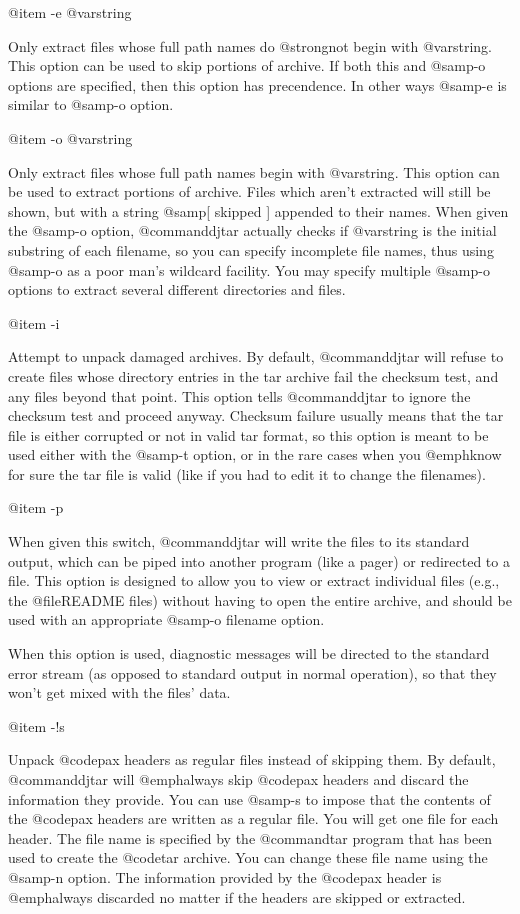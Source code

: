 @item -e @var{string}

Only extract files whose full path names do @strong{not} begin with @var{string}.
This option can be used to skip portions of archive.  If both this
and @samp{-o} options are specified, then this option has precendence.  In
other ways @samp{-e} is similar to @samp{-o} option.

@item -o @var{string}

Only extract files whose full path names begin with @var{string}.
This option can be used to extract portions of archive.  Files which aren't
extracted will still be shown, but with a string @samp{[ skipped ]}
appended to their names.  When given the @samp{-o} option, @command{djtar}
actually checks if @var{string} is the initial substring of each filename,
so you can specify incomplete file names, thus using @samp{-o} as a poor man's
wildcard facility.  You may specify multiple @samp{-o} options to extract
several different directories and files.

@item -i

Attempt to unpack damaged archives.
By default, @command{djtar} will refuse to create files whose directory
entries in the tar archive fail the checksum test, and any files beyond
that point.  This option tells @command{djtar} to ignore the checksum test
and proceed anyway.  Checksum failure usually means that the tar file is
either corrupted or not in valid tar format, so this option is meant to be
used either with the @samp{-t} option, or in the rare cases when you
@emph{know} for sure the tar file is valid (like if you had to edit it to
change the filenames).

@item -p

When given this switch, @command{djtar} will write the files to its standard
output, which can be piped into another program (like a pager) or
redirected to a file.  This option is designed to allow you to view or
extract individual files (e.g., the @file{README} files) without having to
open the entire archive, and should be used with an appropriate @samp{-o
filename} option.

When this option is used, diagnostic messages will be directed to the
standard error stream (as opposed to standard output in normal operation),
so that they won't get mixed with the files' data.

@item -!s

Unpack @code{pax} headers as regular files instead of skipping them.
By default, @command{djtar} will @emph{always} skip @code{pax} headers and
discard the information they provide.  You can use @samp{-s} to impose that
the contents of the @code{pax} headers are written as a regular file.  You will
get one file for each header.  The file name is specified by the @command{tar}
program that has been used to create the @code{tar} archive.  You can change
these file name using the @samp{-n} option.  The information provided by the
@code{pax} header is @emph{always} discarded no matter if the headers are
skipped or extracted.

